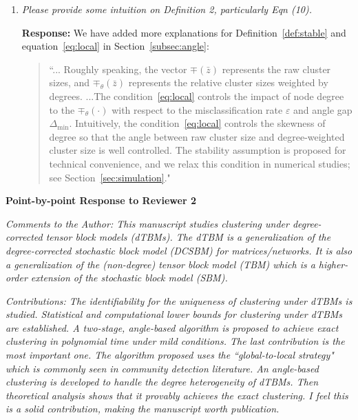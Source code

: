 \documentclass[11pt]{article}
\theoremstyle{definition}
\theoremstyle{definition}
\begin{document}
\begin{enumerate}[wide, labelwidth=!, labelindent=0pt]


\item \textit{Please provide some intuition on Deﬁnition 2, particularly Eqn (10).}

\textbf{Response:} We have added more explanations for Definition~\ref{def:stable} and equation~\eqref{eq:local} in Section~\ref{subsec:angle}:
\begin{quote}
    ``... Roughly speaking, the vector $\mp(\bar z)$ represents the raw cluster sizes, and $\mp_\theta(\bar z)$ represents the relative cluster sizes weighted by degrees. ...The condition~\eqref{eq:local} controls the impact of node degree to the $\mp_{\theta}(\cdot)$ with respect to the misclassification rate $\varepsilon$ and angle gap $\Delta_{\min}$. Intuitively, the condition~\eqref{eq:local} controls the skewness of degree so that the angle between raw cluster size and degree-weighted cluster size is well controlled. The stability assumption is proposed for technical convenience, and we relax this condition in numerical studies; see Section~\ref{sec:simulation}."
\end{quote}

\end{enumerate}

\newpage 
\begin{center}
    \textbf{Point-by-point Response to Reviewer 2}
\end{center}

\textit{Comments to the Author: This manuscript studies clustering under degree-corrected tensor block models (dTBMs). The dTBM is a generalization of the degree-corrected stochastic block model (DCSBM) for matrices/networks. It is also a generalization of the (non-degree) tensor block model (TBM) which is a higher-order extension of the stochastic block model (SBM).}

\textit{Contributions: The identifiability for the uniqueness of clustering under dTBMs is studied.
Statistical and computational lower bounds for clustering under dTBMs are established.
A two-stage, angle-based algorithm is proposed to achieve exact clustering in polynomial time under mild conditions. 
The last contribution is the most important one. The algorithm proposed uses the ``global-to-local strategy" which is commonly seen in community detection literature. An angle-based clustering is developed to handle the degree heterogeneity of dTBMs. Then theoretical analysis shows that it provably achieves the exact clustering. I feel this is a solid contribution, making the manuscript worth publication.} 
\end{document}
